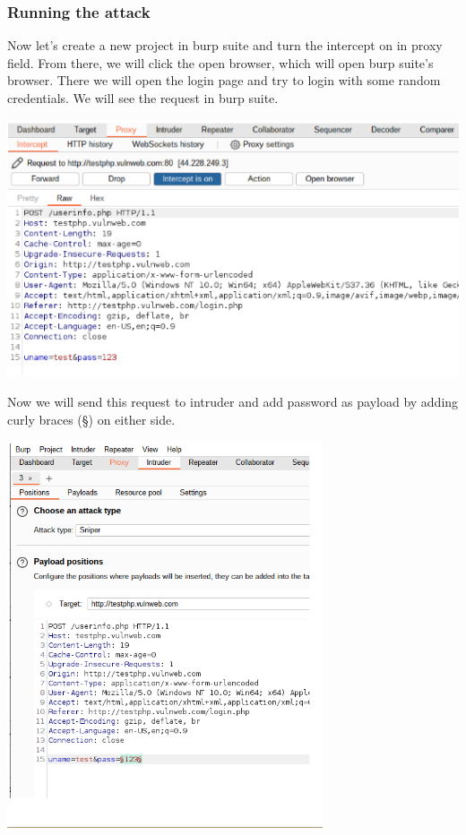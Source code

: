 \documentclass[12pt]{article}
\begin{document}
\subsubsection{Running the attack}\label{subsubsec:running-the-attack}
Now let's create a new project in burp suite and turn the intercept on in proxy field. From there, we will click the open browser, which will open burp suite's browser. There we will open the login page and try to login with some random credentials. We will see the request in burp suite.

\begin{center}
    \includegraphics[max width=\textwidth]{Image11.png}
\end{center}

Now we will send this request to intruder and add password as payload by adding curly braces (§) on either side.

\begin{center}
    \includegraphics[max width=\textwidth]{Image12.png}
\end{center}
\end{document}
